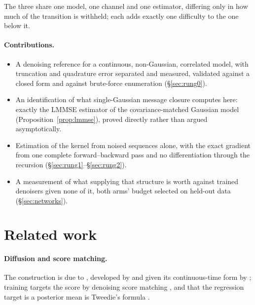 \documentclass{article}
\theoremstyle{definition}
\theoremstyle{plain}
\begin{document}
\noindent
The three share one model, one channel and one estimator, differing only in how much of the
transition is withheld; each adds exactly one difficulty to the one below it.

\paragraph{Contributions.}
\begin{itemize}\itemsep2pt
\item A denoising reference for a continuous, non-Gaussian, correlated model, with truncation and
      quadrature error separated and measured, validated against a closed form and against
      brute-force enumeration (\S\ref{sec:rung0}).
\item An identification of what single-Gaussian message closure computes here: exactly the LMMSE
      estimator of the covariance-matched Gaussian model (Proposition~\ref{prop:lmmse}), proved
      directly rather than argued asymptotically.
\item Estimation of the kernel from noised sequences alone, with the exact gradient from one
      complete forward--backward pass and no differentiation through the recursion
      (\S\ref{sec:rung1}--\S\ref{sec:rung2}).
\item A measurement of what supplying that structure is worth against trained denoisers given none
      of it, both arms' budget selected on held-out data (\S\ref{sec:networks}).
\end{itemize}

\section{Related work}
\label{sec:related}

\paragraph{Diffusion and score matching.} The construction is due to \citet{sohl2015deep}, developed
by \citet{ho2020denoising} and given its continuous-time form by \citet{song2021scorebased}; training targets the
score by denoising score matching \citep{hyvarinen2005estimation,vincent2011connection}, and that the regression
target is a posterior mean is Tweedie's formula \citep{robbins1956empirical,miyasawa1961empirical,efron2011tweedie}.
\end{document}
